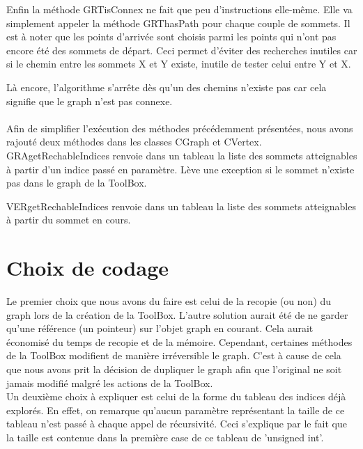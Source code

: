 		Enfin la méthode GRTisConnex ne fait que peu d'instructions elle-même. Elle va simplement appeler la méthode GRThasPath pour chaque couple de sommets. Il est à noter que les points d'arrivée sont choisis parmi les points qui n'ont pas encore été des sommets de départ. Ceci permet d'éviter des recherches inutiles car si le chemin entre les sommets X et Y existe, inutile de tester celui entre Y et X.
		
		Là encore, l'algorithme s'arrête dès qu'un des chemins n'existe pas car cela signifie que le graph n'est pas connexe.\\\\
		
		Afin de simplifier l'exécution des méthodes précédemment présentées, nous avons rajouté deux méthodes dans les classes CGraph et CVertex.\\
		
		GRAgetRechableIndices renvoie dans un tableau la liste des sommets atteignables à partir d'un indice passé en paramètre. Lève une exception si le sommet n'existe pas dans le graph de la ToolBox.
		
		VERgetRechableIndices renvoie dans un tableau la liste des sommets atteignables à partir du sommet en cours.
		
		\newpage
		
	\chapter{Choix de codage}
		Le premier choix que nous avons du faire est celui de la recopie (ou non) du graph lors de la création de la ToolBox. L'autre solution aurait été de ne garder qu'une référence (un pointeur) sur l'objet graph en courant. Cela aurait économisé du temps de recopie et de la mémoire. Cependant, certaines méthodes de la ToolBox modifient de manière irréversible le graph. C'est à cause de cela que nous avons prit la décision de dupliquer le graph afin que l'original ne soit jamais modifié malgré les actions de la ToolBox.\\
		
		Un deuxième choix à expliquer est celui de la forme du tableau des indices déjà explorés. En effet, on remarque qu'aucun paramètre représentant la taille de ce tableau n'est passé à chaque appel de récursivité. Ceci s'explique par le fait que la taille est contenue dans la première case de ce tableau de 'unsigned int'.
		
